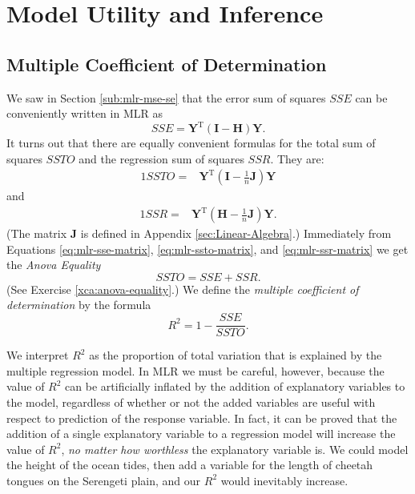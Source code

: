 \documentclass[captions=tableheading]{scrbook}
\begin{document}
\section{Model Utility and Inference}
\label{sec-1-3}

\label{sec:Model-Utility-and-MLR}
\subsection{Multiple Coefficient of Determination}
\label{sec-1-3-1}


We saw in Section \ref{sub:mlr-mse-se} that the error sum of squares $SSE$ can be conveniently written in MLR as 
\begin{equation}
SSE=\mathbf{Y}^{\mathrm{T}}(\mathbf{I}-\mathbf{H})\mathbf{Y}.\label{eq:mlr-sse-matrix}
\end{equation}
It turns out that there are equally convenient formulas for the total sum of squares $SSTO$ and the regression sum of squares $SSR$. They are:
\begin{alignat}{1}
SSTO= & \mathbf{Y}^{\mathrm{T}}\left(\mathbf{I}-\frac{1}{n}\mathbf{J}\right)\mathbf{Y}\label{eq:mlr-ssto-matrix}
\end{alignat}
and
\begin{alignat}{1}
SSR= & \mathbf{Y}^{\mathrm{T}}\left(\mathbf{H}-\frac{1}{n}\mathbf{J}\right)\mathbf{Y}.\label{eq:mlr-ssr-matrix}
\end{alignat}
(The matrix $\mathbf{J}$ is defined in Appendix \ref{sec:Linear-Algebra}.) Immediately from Equations \ref{eq:mlr-sse-matrix}, \ref{eq:mlr-ssto-matrix}, and \ref{eq:mlr-ssr-matrix} we get the \emph{Anova Equality}
\begin{equation} 
SSTO=SSE+SSR.
\end{equation}
(See Exercise \ref{xca:anova-equality}.) We define the \emph{multiple coefficient of determination} by the formula
\begin{equation} 
R^{2}=1-\frac{SSE}{SSTO}.
\end{equation}

We interpret $R^{2}$ as the proportion of total variation that is explained by the multiple regression model. In MLR we must be careful, however, because the value of $R^{2}$ can be artificially inflated by the addition of explanatory variables to the model, regardless of whether or not the added variables are useful with respect to prediction of the response variable. In fact, it can be proved that the addition of a single explanatory variable to a regression model will increase the value of $R^{2}$, \emph{no matter how worthless} the explanatory variable is. We could model the height of the ocean tides, then add a variable for the length of cheetah tongues on the Serengeti plain, and our $R^{2}$ would inevitably increase. 
\end{document}
